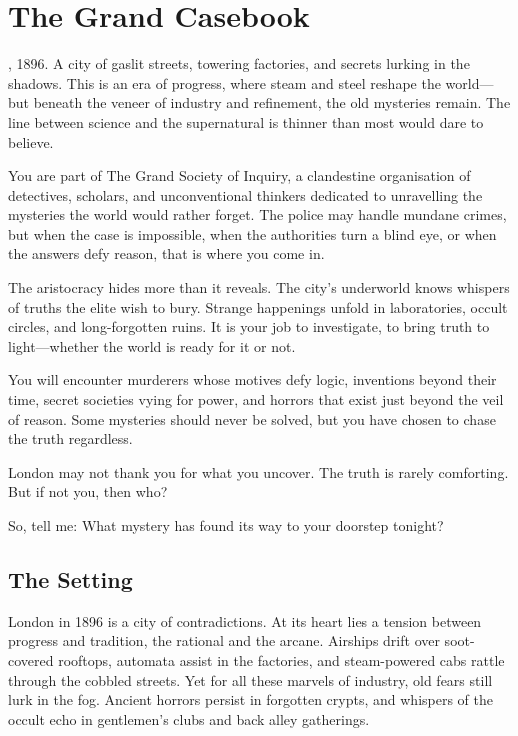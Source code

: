 \chapter{The Grand Casebook}\label{chap:grand-casebook}

\begin{WyrdSettingHeading}
    , 1896. A city of gaslit streets, towering factories, and secrets lurking in the shadows. This is an era of progress, where steam and steel reshape the world—but beneath the veneer of industry and refinement, the old mysteries remain. The line between science and the supernatural is thinner than most would dare to believe.

    You are part of The Grand Society of Inquiry, a clandestine organisation of detectives, scholars, and unconventional thinkers dedicated to unravelling the mysteries the world would rather forget. The police may handle mundane crimes, but when the case is impossible, when the authorities turn a blind eye, or when the answers defy reason, that is where you come in.

    The aristocracy hides more than it reveals. The city’s underworld knows whispers of truths the elite wish to bury. Strange happenings unfold in laboratories, occult circles, and long-forgotten ruins. It is your job to investigate, to bring truth to light—whether the world is ready for it or not.

    You will encounter murderers whose motives defy logic, inventions beyond their time, secret societies vying for power, and horrors that exist just beyond the veil of reason. Some mysteries should never be solved, but you have chosen to chase the truth regardless.

    London may not thank you for what you uncover. The truth is rarely comforting. But if not you, then who?

    So, tell me: What mystery has found its way to your doorstep tonight?
\end{WyrdSettingHeading}

\section{The Setting}

London in 1896 is a city of contradictions. At its heart lies a tension between progress and tradition, the rational and the arcane. Airships drift over soot-covered rooftops, automata assist in the factories, and steam-powered cabs rattle through the cobbled streets. Yet for all these marvels of industry, old fears still lurk in the fog. Ancient horrors persist in forgotten crypts, and whispers of the occult echo in gentlemen’s clubs and back alley gatherings.

